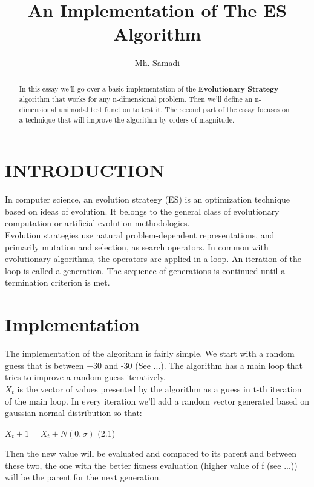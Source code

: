 \documentclass[letterpaper, 12 pt, conference]{ieeeconf}  %
\title{\LARGE \bf
An Implementation of The ES Algorithm
}
\author{Mh. Samadi%
}
\begin{document}
\maketitle
\thispagestyle{empty}
\pagestyle{empty}


\begin{abstract}

In this essay we'll go over a basic implementation of the \textbf{Evolutionary Strategy} algorithm that works for any n-dimensional problem. Then we'll define an n-dimensional unimodal test function to test it. The second part of the essay focuses on a technique that will improve the algorithm by orders of magnitude.

\end{abstract}


\section{INTRODUCTION}

In computer science, an evolution strategy (ES) is an optimization technique based on ideas of evolution. It belongs to the general class of evolutionary computation or artificial evolution methodologies.
\\
Evolution strategies use natural problem-dependent representations, and primarily mutation and selection, as search operators. In common with evolutionary algorithms, the operators are applied in a loop. An iteration of the loop is called a generation. The sequence of generations is continued until a termination criterion is met.

\section{Implementation}
The implementation of the algorithm is fairly simple. We start with a random guess that is between +30 and -30 (See ...). The algorithm has a main loop that tries to improve a random guess iteratively.
\\
$X_t$ is the vector of values presented by the algorithm as a guess in t-th iteration of the main loop. In every iteration we'll add a random vector generated based on gaussian normal distribution so that:
\begin{center}
$X_t+1 = X_t + N(0, \sigma)$                    (2.1)
\end{center}
Then the new value will be evaluated and compared to its parent and between these two, the one with the better fitness evaluation (higher value of f (see ...)) will be the parent for the next generation.
\end{document}
